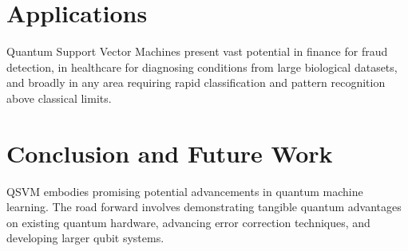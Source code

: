 \documentclass{article}
\begin{document}
\section{Applications}
Quantum Support Vector Machines present vast potential in finance for fraud detection, in healthcare for diagnosing conditions from large biological datasets, and broadly in any area requiring rapid classification and pattern recognition above classical limits.

\section{Conclusion and Future Work}
QSVM embodies promising potential advancements in quantum machine learning. The road forward involves demonstrating tangible quantum advantages on existing quantum hardware, advancing error correction techniques, and developing larger qubit systems.
\end{document}
